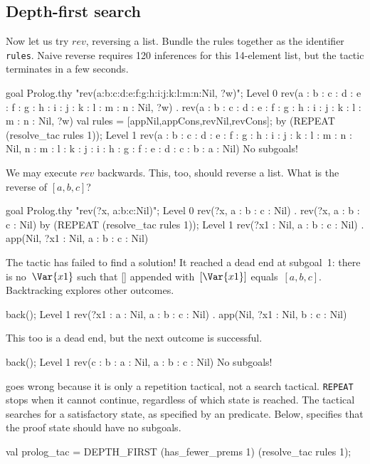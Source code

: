 \subsection{Depth-first search}
Now let us try $rev$, reversing a list.
Bundle the rules together as the \ML{} identifier {\tt rules}.  Naive
reverse requires 120 inferences for this 14-element list, but the tactic
terminates in a few seconds.
\begin{ttbox}
goal Prolog.thy "rev(a:b:c:d:e:f:g:h:i:j:k:l:m:n:Nil, ?w)";
{\out Level 0}
{\out rev(a : b : c : d : e : f : g : h : i : j : k : l : m : n : Nil, ?w)}
{. rev(a : b : c : d : e : f : g : h : i : j : k : l : m : n : Nil,}
{\out         ?w)}
\ttbreak
val rules = [appNil,appCons,revNil,revCons];
\ttbreak
by (REPEAT (resolve_tac rules 1));
{\out Level 1}
{\out rev(a : b : c : d : e : f : g : h : i : j : k : l : m : n : Nil,}
{\out     n : m : l : k : j : i : h : g : f : e : d : c : b : a : Nil)}
{\out No subgoals!}
\end{ttbox}
We may execute $rev$ backwards.  This, too, should reverse a list.  What
is the reverse of $[a,b,c]$?
\begin{ttbox}
goal Prolog.thy "rev(?x, a:b:c:Nil)";
{\out Level 0}
{\out rev(?x, a : b : c : Nil)}
{. rev(?x, a : b : c : Nil)}
\ttbreak
by (REPEAT (resolve_tac rules 1));
{\out Level 1}
{\out rev(?x1 : Nil, a : b : c : Nil)}
{. app(Nil, ?x1 : Nil, a : b : c : Nil)}
\end{ttbox}
The tactic has failed to find a solution!  It reached a dead end at
subgoal~1: there is no~$\Var{x1}$ such that [] appended with~$[\Var{x1}]$
equals~$[a,b,c]$.  Backtracking explores other outcomes.
\begin{ttbox}
back();
{\out Level 1}
{\out rev(?x1 : a : Nil, a : b : c : Nil)}
{. app(Nil, ?x1 : Nil, b : c : Nil)}
\end{ttbox}
This too is a dead end, but the next outcome is successful.
\begin{ttbox}
back();
{\out Level 1}
{\out rev(c : b : a : Nil, a : b : c : Nil)}
{\out No subgoals!}
\end{ttbox}
 goes wrong because it is only a repetition tactical, not a
search tactical.  {\tt REPEAT} stops when it cannot continue, regardless of
which state is reached.  The tactical  searches for a
satisfactory state, as specified by an \ML{} predicate.  Below,
 specifies that the proof state should have no
subgoals.
\begin{ttbox}
val prolog_tac = DEPTH_FIRST (has_fewer_prems 1) 
                             (resolve_tac rules 1);
\end{ttbox}
